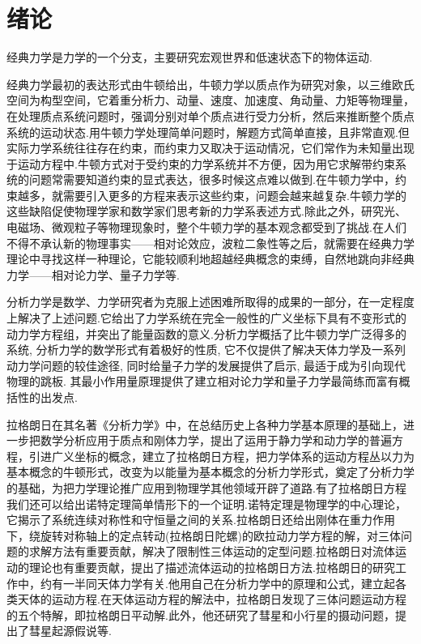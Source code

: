 \documentclass[UTF8,10.5pt,a4paper]{ctexart}
\numberwithin{equation}{section}
\theoremstyle{definition}
\theoremstyle{definition}
\begin{document}
\section{绪论}

经典力学是力学的一个分支，主要研究宏观世界和低速状态下的物体运动.
\par 经典力学最初的表达形式由牛顿给出，牛顿力学以质点作为研究对象，以三维欧氏空间为构型空间，它着重分析力、动量、速度、加速度、角动量、力矩等物理量，在处理质点系统问题时，强调分别对单个质点进行受力分析，然后来推断整个质点系统的运动状态.用牛顿力学处理简单问题时，解题方式简单直接，且非常直观.但实际力学系统往往存在约束，而约束力又取决于运动情况，它们常作为未知量出现于运动方程中.牛顿方式对于受约束的力学系统并不方便，因为用它求解带约束系统的问题常需要知道约束的显式表达，很多时候这点难以做到.在牛顿力学中，约束越多，就需要引入更多的方程来表示这些约束，问题会越来越复杂.牛顿力学的这些缺陷促使物理学家和数学家们思考新的力学系表述方式.除此之外，研究光、电磁场、微观粒子等物理现象时，整个牛顿力学的基本观念都受到了挑战.在人们不得不承认新的物理事实——相对论效应，波粒二象性等之后，就需要在经典力学理论中寻找这样一种理论，它能较顺利地超越经典概念的束缚，自然地跳向非经典力学——相对论力学、量子力学等.
\par 分析力学是数学、力学研究者为克服上述困难所取得的成果的一部分，在一定程度上解决了上述问题.它给出了力学系统在完全一般性的广义坐标下具有不变形式的动力学方程组，并突出了能量函数的意义.分析力学概括了比牛顿力学广泛得多的系统, 分析力学的数学形式有着极好的性质, 它不仅提供了解决天体力学及一系列动力学问题的较佳途径, 同时给量子力学的发展提供了启示, 最适于成为引向现代物理的跳板. 其最小作用量原理提供了建立相对论力学和量子力学最简练而富有概括性的出发点.
\par 拉格朗日在其名著《分析力学》中，在总结历史上各种力学基本原理的基础上，进一步把数学分析应用于质点和刚体力学，提出了运用于静力学和动力学的普遍方程，引进广义坐标的概念，建立了拉格朗日方程，把力学体系的运动方程丛以力为基本概念的牛顿形式，改变为以能量为基本概念的分析力学形式，奠定了分析力学的基础，为把力学理论推广应用到物理学其他领域开辟了道路.有了拉格朗日方程我们还可以给出诺特定理简单情形下的一个证明.诺特定理是物理学的中心理论，它揭示了系统连续对称性和守恒量之间的关系.拉格朗日还给出刚体在重力作用下，绕旋转对称轴上的定点转动(拉格朗日陀螺)的欧拉动力学方程的解，对三体问题的求解方法有重要贡献，解决了限制性三体运动的定型问题.拉格朗日对流体运动的理论也有重要贡献，提出了描述流体运动的拉格朗日方法.拉格朗日的研究工作中，约有一半同天体力学有关.他用自己在分析力学中的原理和公式，建立起各类天体的运动方程.在天体运动方程的解法中，拉格朗日发现了三体问题运动方程的五个特解，即拉格朗日平动解.此外，他还研究了彗星和小行星的摄动问题，提出了彗星起源假说等.
\end{document}
